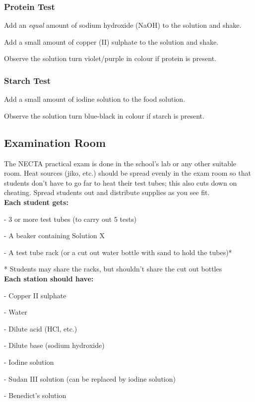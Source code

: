 \subsubsection{Protein Test}
\begin{itemize*}
\item Add an \emph{equal} amount of sodium hydroxide (NaOH) to the solution and shake. 
\item Add a small amount of copper (II) sulphate to the solution and shake.
\item Observe the solution turn violet\slash purple in colour if protein is present.
\end{itemize*}

\subsubsection{Starch Test}
\begin{itemize*}
\item Add a small amount of iodine solution to the food solution.
\item Observe the solution turn blue-black in colour if starch is present.
\end{itemize*}


\subsection{Examination Room}
The NECTA practical exam is done in the school's lab or any other suitable room. Heat sources (jiko, etc.) should be spread evenly in the exam room so that students don't have to go far to heat their test tubes; this also cuts down on cheating. Spread students out and distribute supplies as you see fit.\\

\noindent \textbf{Each student gets:}
\begin{itemize*}
\item[-] 3 or more test tubes (to carry out 5 tests)
\item[-] A beaker containing Solution X
\item[-] A test tube rack (or a cut out water bottle with sand to hold the tubes)*
\end{itemize*}
* Students may share the racks, but shouldn't share the cut out bottles\\

\noindent \textbf{Each station should have:}
\begin{itemize*}
\item[-] Copper II sulphate
\item[-] Water
\item[-] Dilute acid (HCl, etc.)
\item[-] Dilute base (sodium hydroxide)
\item[-] Iodine solution
\item[-] Sudan III solution (can be replaced by iodine solution)
\item[-] Benedict's solution
\end{itemize*}

